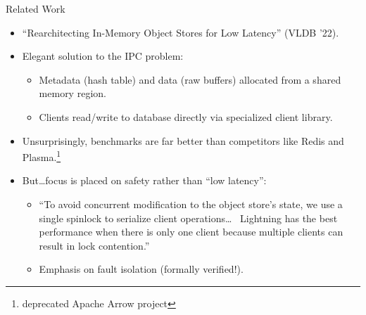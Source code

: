 \documentclass[10pt,aspectratio=169]{beamer}
\begin{document}
\begin{frame}{Related Work}
	\begin{itemize}
        \item ``Rearchitecting In-Memory Object Stores for Low Latency'' (VLDB
        '22).
        \item Elegant solution to the IPC problem:
        \begin{itemize}
            \item Metadata (hash table) and data (raw buffers) allocated from
            a shared memory region.
            \item Clients read/write to database directly via specialized client
            library.
        \end{itemize}
        \item Unsurprisingly, benchmarks are far better than competitors like
        Redis and Plasma.\footnote{deprecated Apache Arrow project}
        \item But\dots focus is placed on safety rather than ``low latency'':
        \begin{itemize}
            \item ``To avoid concurrent modification to the object store’s
            state, we use a single spinlock to serialize client operations\dots
            \, Lightning has the best performance when there is only one client
            because multiple clients can result in lock contention.''
            \item Emphasis on fault isolation (formally verified!).
        \end{itemize}
	\end{itemize}
\end{frame}
\end{document}
